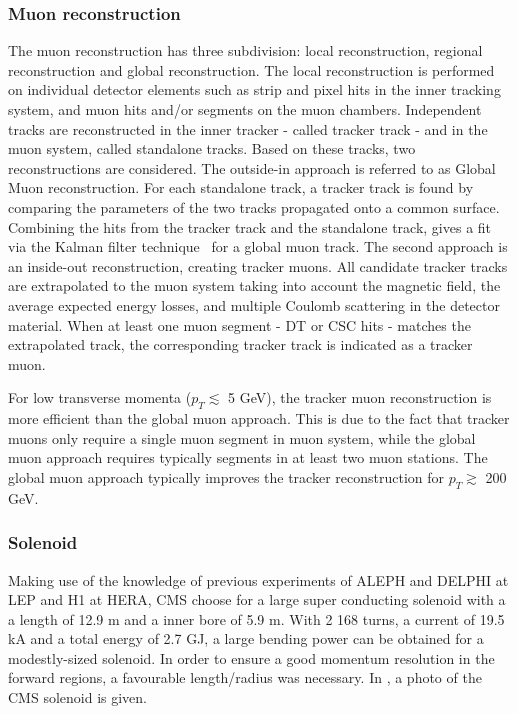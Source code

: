 \subsubsection*{Muon reconstruction}
 The muon reconstruction\cite{Chatrchyan:2012xi} has three subdivision: local reconstruction, regional reconstruction and global reconstruction. 
The local reconstruction is performed on individual detector elements such as strip and pixel hits in the inner tracking system, and muon hits and/or segments on the muon chambers. Independent tracks are reconstructed in the inner tracker - called tracker track -  and in the muon system, called standalone tracks.
Based on these tracks, two reconstructions are considered.
The outside-in approach is referred to as Global Muon reconstruction. 
 For each standalone track, a tracker track is found by comparing the parameters of the two tracks propagated onto a common surface. Combining the hits from the tracker track and the standalone track, gives a fit via the Kalman filter technique~\cite{FRUHWIRTH1987444,Billoir:1989mh} for a global muon track. 
 The second approach is an inside-out reconstruction, creating tracker muons. 
 All candidate tracker tracks are extrapolated to the muon system taking into account the magnetic field, the average expected energy losses, and multiple Coulomb scattering in the detector material. When at least one muon segment - DT or CSC hits -  matches the extrapolated track, the corresponding tracker track is indicated as a tracker muon. 
 
 For low transverse momenta ($p_T \lesssim$ 5 \si{ \GeV}), the tracker muon reconstruction is  more efficient than the global muon approach. This is due to the fact that tracker muons only require a single muon  segment in muon system, while the global muon approach requires typically segments in at least two muon stations. The global muon approach typically improves the tracker reconstruction for $p_T\gtrsim$ 200 \si{ \GeV}.
 

\subsubsection{Solenoid}
	Making use of the knowledge of previous experiments of ALEPH and DELPHI at LEP and H1 at HERA, CMS choose for a large super conducting solenoid with a a length of 12.9 \si{ \meter} and a inner bore of 5.9 \si{ \meter}\cite{Bayatian:922757}. With 2 168 turns, a current of 19.5 \si{ \kilo \ampere} and  a total energy of 2.7 \si{ \giga \joule}, a large bending power can be obtained for a modestly-sized solenoid. In order to ensure a good momentum resolution in the forward regions, a favourable length/radius was necessary.  In , a photo of the CMS solenoid is given. 


